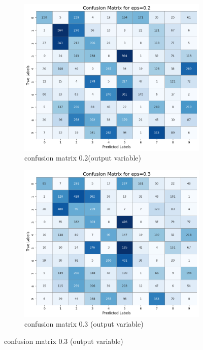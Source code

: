 \documentclass[11pt,onside]{article}
\begin{document}
\begin{figure}[h]
  \centering
  \begin{subfigure}[b]{0.49\textwidth}
    \centering
    \includegraphics[width=\textwidth]{V2_images/_correct_labels_confusion_matrix_eps_0.2.png}
    \caption{confusion matrix 0.2(output variable)}
    \label{fig:image1}
  \end{subfigure}
  \hfill
  \begin{subfigure}[b]{0.49\textwidth}
    \centering
    \includegraphics[width=\textwidth]{V2_images/_correct_labels_confusion_matrix_eps_0.3.png}
    \caption{confusion matrix 0.3 (output variable)}
    \label{fig:image2}
  \end{subfigure}
  \label{fig:images}
\end{figure}
\end{document}
